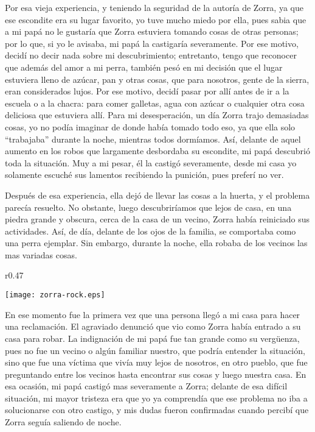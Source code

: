 Por esa vieja experiencia, y teniendo la seguridad de la autoría de Zorra, ya que ese escondite era su lugar favorito, yo tuve mucho miedo por ella, pues sabia que a mi papá no le gustaría que Zorra estuviera tomando cosas de otras personas; por lo que, si yo le avisaba, mi papá la castigaría severamente. Por ese motivo, decidí no decir nada sobre mi descubrimiento; entretanto, tengo que reconocer que además del amor a mi perra, también pesó en mi decisión que el lugar estuviera lleno de azúcar, pan y otras cosas, que para nosotros, gente de la sierra, eran considerados lujos.
Por ese motivo, decidí pasar por allí antes de ir a la escuela o a la chacra: para comer galletas, agua con azúcar o cualquier otra cosa deliciosa que estuviera allí.
Para mi desesperación, un día Zorra trajo demasiadas cosas, yo no podía imaginar de donde había tomado todo eso, ya que ella solo ``trabajaba'' durante la noche, mientras todos dormíamos. Así, delante de aquel aumento en los robos que largamente desbordaba su escondite, mi papá descubrió toda la situación.
Muy a mi pesar, él la castigó severamente, desde mi casa yo solamente escuché sus lamentos recibiendo la punición, pues preferí no ver.


Después de esa experiencia, ella dejó de llevar las cosas a la huerta, y el problema parecía resuelto. No obstante, luego descubriríamos que lejos de casa, en una piedra grande y obscura, cerca de la casa de un vecino, 
Zorra había reiniciado sus actividades. Así, de día, delante de los ojos de la familia, se comportaba como una perra ejemplar. Sin embargo, durante la noche, ella robaba de los vecinos las mas variadas cosas.

\ifdefined\EnableIncludeImages
\begin{wrapfigure}{r}{0.47\textwidth}
  \begin{center}
  \vspace{-10pt}
    \texttt{[image: zorra-rock.eps]}
  \end{center}
  \vspace{-20pt}
\end{wrapfigure}
\fi
En ese momento fue la primera vez que una persona llegó a mi casa para hacer una reclamación. El agraviado denunció que vio como Zorra había entrado a su casa para robar.
La indignación de mi papá fue tan grande como su vergüenza, pues no fue un vecino o algún familiar nuestro, que podría entender la situación, sino que fue una víctima que vivía muy lejos de nosotros, en otro pueblo, que fue preguntando entre los vecinos hasta encontrar sus cosas y luego nuestra casa.
En esa ocasión, mi papá castigó mas severamente a Zorra; delante de esa difícil situación, mi mayor tristeza era que yo ya comprendía que ese problema no iba a solucionarse con otro castigo, y mis dudas fueron confirmadas cuando percibí que Zorra seguía saliendo de noche.

